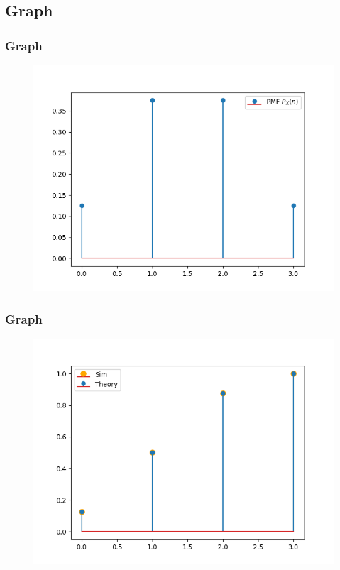 \documentclass{beamer}
\theoremstyle{remark}
\numberwithin{equation}{section}
\begin{document}
      \subsection{Graph}
      \begin{frame}[fragile]
        \frametitle{Graph}
        \begin{figure}[h!]
          \centering
          \includegraphics[width=1\columnwidth]{figs/pmf1.png}
          \label{stemplot}
        \end{figure}
      \end{frame}
      \begin{frame}[fragile]
        \frametitle{Graph}
        \begin{figure}[h!]
          \centering
          \includegraphics[width=1\columnwidth]{figs/cdf.png}
          \label{stemplot}
        \end{figure}
      \end{frame}
\end{document}
